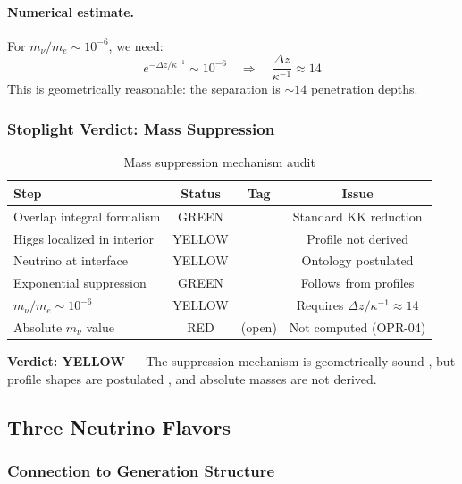 \paragraph{Numerical estimate.}
For $m_\nu/m_e \sim 10^{-6}$, we need:
\begin{equation}
    e^{-\Delta z / \kappa^{-1}} \sim 10^{-6}
    \quad\Longrightarrow\quad
    \frac{\Delta z}{\kappa^{-1}} \approx 14
\end{equation}
This is geometrically reasonable: the separation is $\sim 14$ penetration depths.

\subsubsection{Stoplight Verdict: Mass Suppression}

\begin{table}[ht]
\centering
\caption{Mass suppression mechanism audit}
\label{tab:ch6_mass_stoplight}
\begin{tabular}{lccc}
\toprule
\textbf{Step} & \textbf{Status} & \textbf{Tag} & \textbf{Issue} \\
\midrule
Overlap integral formalism & GREEN & \tagBL{} & Standard KK reduction \\
Higgs localized in interior & YELLOW & \tagP{} & Profile not derived \\
Neutrino at interface & YELLOW & \tagP{} & Ontology postulated \\
Exponential suppression & GREEN & \tagDc{} & Follows from profiles \\
$m_\nu/m_e \sim 10^{-6}$ & YELLOW & \tagI{} & Requires $\Delta z/\kappa^{-1} \approx 14$ \\
Absolute $m_\nu$ value & RED & (open) & Not computed (OPR-04) \\
\bottomrule
\end{tabular}
\end{table}

\textbf{Verdict: YELLOW} --- The suppression mechanism is geometrically sound
\tagDc{}, but profile shapes are postulated \tagP{}, and absolute masses are
not derived.

\subsection{Three Neutrino Flavors}
\label{sec:ch6_three_flavors}

\subsubsection{Connection to Generation Structure}


